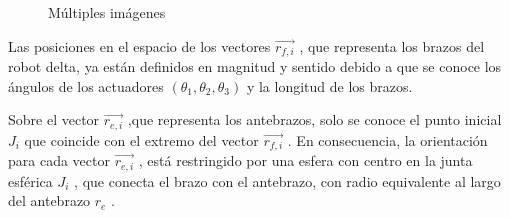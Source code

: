\newpage


            \begin{figure}
             \centering
                 \caption{Múltiples imágenes}
                 \label{f:Desplazamiento_J}
            \end{figure}
            
        Las posiciones en el espacio de los vectores $\overrightarrow{r_{f,i}}$  , que representa los brazos del robot delta, ya están definidos en magnitud y sentido debido a que se conoce los ángulos de los actuadores    $\left(  \theta _{1}, \theta _{2}, \theta _{3} \right)$   y la longitud de los brazos.
        
        Sobre el vector  $\overrightarrow{r_{e,i}}$  ,que representa los antebrazos, solo se conoce el punto inicial  $J_{i}$  que coincide con el extremo del vector   $\overrightarrow{r_{f,i}}$  . En consecuencia, la orientación para cada vector $\overrightarrow{r_{e,i}}$  , está restringido por una esfera con centro en la junta esférica  $J_{i}$ , que conecta el brazo con el antebrazo, con radio equivalente al largo del antebrazo  $r_{e}$ .
        
